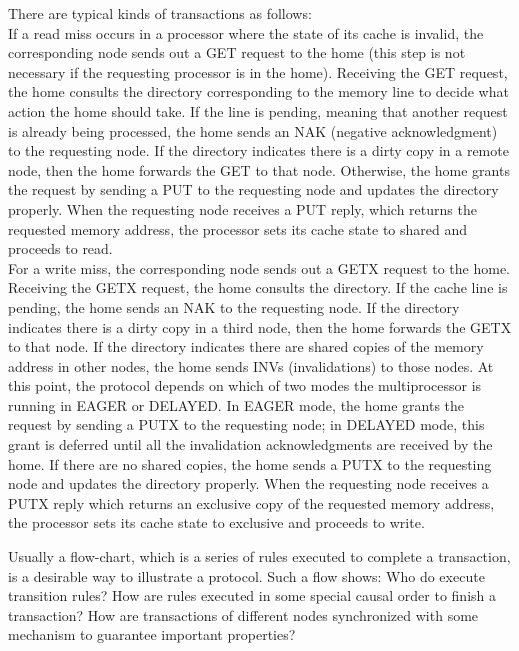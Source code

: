\documentclass{llncs-new}
\newcommand{\bedt}[1]{{\color{black}#1}}
\begin{document}
 There are typical kinds of transactions as follows:\\%
 If a read miss occurs in a processor where the state of its cache is invalid, the corresponding node sends out a GET request to the
home (this step is not necessary if the requesting processor is in the home). Receiving the
GET request, the home consults the directory corresponding to the memory line to decide
what action the home should take. If the line is pending, meaning that another request
is already being processed, the home sends an NAK (negative acknowledgment) to the
requesting node. If the directory indicates there is a dirty copy in a remote node, then the
home forwards the GET to that node. Otherwise, the home grants the request by sending
a PUT to the requesting node and updates the directory properly. When the requesting
node receives a PUT reply, which returns the requested memory \bedt{address}, the processor sets
its cache state to shared and proceeds to read.\\%
 For a write miss, the corresponding node sends out a GETX request to the home.
Receiving the GETX request, the home consults the directory. If the \bedt{cache} line is pending,
the home sends an NAK to the requesting node. If the directory indicates there is a dirty
copy in a third node, then the home forwards the GETX to that node. If the directory
indicates there are shared copies of the memory \bedt{address} in other nodes, the home sends
INVs (invalidations) to those nodes. At this point, the protocol depends on which of two
modes the multiprocessor is running in EAGER or DELAYED. In EAGER mode, the home
grants the request by sending a PUTX to the requesting node; in DELAYED mode, this
grant is deferred until all the invalidation acknowledgments are received by the home. If
there are no shared copies, the home sends a PUTX to the requesting node and updates
the directory properly. When the requesting node receives a PUTX reply which returns
an exclusive copy of the requested memory \bedt{address}, the processor sets its cache state to
exclusive and proceeds to write.


Usually a flow-chart,  which is a series of rules executed to complete a %
transaction, is a desirable way to illustrate a protocol. Such a flow shows: Who do execute transition rules? How  are rules executed in some special causal order to finish a transaction? How are transactions of different nodes  synchronized with some mechanism to guarantee  important properties? %
\end{document}
